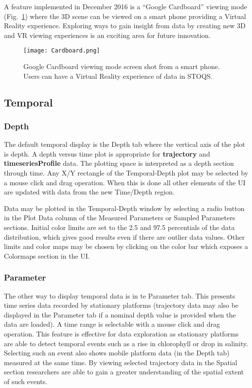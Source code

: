 \documentclass[conference]{IEEEtran}
\begin{document}
A feature implemented in December 2016 is a ``Google Cardboard'' viewing mode
(Fig.~\ref{fig:Cardboard}) where the 3D scene can be viewed on a smart phone providing a Virtual 
Reality experience. Exploring ways to gain insight from data by creating new
3D and VR viewing experiences is an exciting area for future innovation.

\begin{figure}[htbp]
\centering
\texttt{[image: Cardboard.png]}
\caption{Google Cardboard viewing mode screen shot from a smart phone. 
Users can have a Virtual Reality experience of data in STOQS.}
\label{fig:Cardboard}
\end{figure}

\subsection{Temporal}

\subsubsection{Depth}
The default temporal display is the Depth tab where the vertical axis of the plot 
is depth. A depth versus time plot is appropriate for \textbf{trajectory} and 
\textbf{timeseriesProfile} data. The plotting space is interpreted as a 
depth section through time. Any X/Y rectangle of the Temporal-Depth 
plot may be selected by a mouse click and drag operation. 
When this is done all other elements of the UI are updated with data 
from the new Time/Depth region.

Data may be plotted in the Temporal-Depth window by selecting a radio button
in the Plot Data column of the Measured Parameters or Sampled Parameters sections.
Initial color limits are set to the 2.5 and 97.5 percentials of the data distribution,
which gives good results even if there are outlier data values. Other limits and
color maps may be chosen by clicking on the color bar which exposes a Colormaps section in the UI.

\subsubsection{Parameter}
The other way to display temporal data is in te Parameter tab.
This presents time series data recorded by stationary platforms
(trajectory data may also be displayed in the Parameter tab if a nominal
depth value is provided when the data are loaded).
A time range is selectable with a mouse click and drag operation. This 
feature is effective for data exploration as stationary platforms are able 
to detect temporal events such as a rise in chlorophyll or drop in salinity. 
Selecting such an event also shows mobile platform data (in the Depth tab) 
measured at the same time. By viewing selected trajectory data in the Spatial section 
researchers are able to gain a greater understanding of the spatial 
extent of such events.
\end{document}
